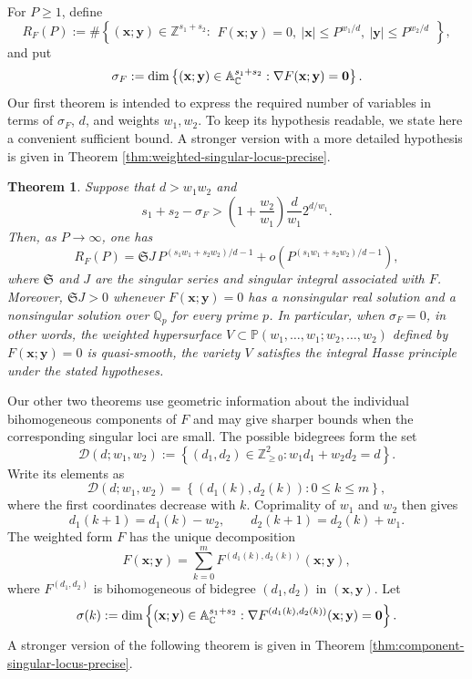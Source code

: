 \documentclass[12pt,reqno]{amsart}
\newtheorem{theorem}{Theorem}[section]
\theoremstyle{definition}
\theoremstyle{remark}
\numberwithin{equation}{section}
\def\bfx{{\mathbf x}}
\def\bfy{{\mathbf y}}
\def\C{{\mathbb C}}\def\D{{\mathbb D}}
\def\Z{{\mathbb Z}}\def\Q{{\mathbb Q}}
\def\A{{\mathbb A}}
\begin{document}
For $P\geq1$, define
\[
R_F(P):=\#\left\{(\bfx;\bfy)\in\Z^{s_1+s_2}:
\begin{array}{c}
F(\bfx;\bfy)=0,\ 
|\bfx|\leq P^{w_1/d},\ |\bfy|\leq P^{w_2/d}
\end{array}
\right\},
\]
and put
\begin{equation}\label{def of sigmaF}
\sigma_F:=\dim\left\{(\bfx;\bfy)\in\A_{\C}^{s_1+s_2}:
\nabla F(\bfx;\bfy)=\bf0\right\}.
\end{equation}
Our first theorem is intended to express the required number of variables in
terms of $\sigma_F$, $d$, and weights $w_1,w_2$.  To keep its hypothesis
readable, we state here a convenient sufficient bound.  A stronger version
with a more detailed hypothesis is given in Theorem
\ref{thm:weighted-singular-locus-precise}.
\begin{theorem}\label{thm:weighted-singular-locus}
Suppose that $d>w_1w_2$ and
\[
s_1+s_2-\sigma_F>
\left(1+\frac{w_2}{w_1}\right)
\frac d{w_1}2^{d/w_1}.
\]
Then, as $P\to\infty$, one has
\[
R_F(P)=\mathfrak S J\,P^{(s_1w_1+s_2w_2)/d-1}
+o\left(P^{(s_1w_1+s_2w_2)/d-1}\right),
\]
where $\mathfrak S$ and $J$ are the singular series and singular integral
associated with $F$. Moreover, $\mathfrak S J>0$ whenever
$F(\bfx;\bfy)=0$ has a nonsingular real solution and a nonsingular solution
over $\Q_p$ for every prime $p$. In particular, when $\sigma_F=0$, in other words, the
weighted hypersurface $V\subset \mathbb{P}(w_1,\ldots,w_1;w_2,\ldots,w_2)$ defined by $F(\bfx;\bfy)=0$ is quasi-smooth, the variety $V$ satisfies the integral Hasse
principle under the stated hypotheses.
\end{theorem}



Our other two theorems use geometric information about the individual
bihomogeneous components of $F$ and may give sharper bounds when the
corresponding singular loci are small. The possible bidegrees form the set
\[
    \mathcal D(d;w_1,w_2)
    :=\left\{(d_1,d_2)\in\Z_{\geq0}^2:
    w_1d_1+w_2d_2=d\right\}.
\]
Write its elements as
\[
    \mathcal D(d;w_1,w_2)
    =\left\{(d_1(k),d_2(k)):0\leq k\leq m\right\},
\]
where the first coordinates decrease with $k$. Coprimality of $w_1$ and
$w_2$ then gives
\[
    d_1(k+1)=d_1(k)-w_2,
    \qquad
    d_2(k+1)=d_2(k)+w_1.
\]
The weighted form $F$ has the unique decomposition
\begin{equation}\label{eqs:decomp}
    F(\bfx;\bfy)
    =\sum_{k=0}^{m}
    F^{(d_1(k),d_2(k))}(\bfx;\bfy),
\end{equation}
where $F^{(d_1,d_2)}$ is bihomogeneous of bidegree $(d_1,d_2)$ in
$(\bfx,\bfy)$. Let
\begin{equation}\label{def:sigma k}
    \sigma(k):=\dim\left\{(\bfx;\bfy)\in\A_{\C}^{s_1+s_2}:
    \nabla F^{(d_1(k),d_2(k))}(\bfx;\bfy)=\bf0\right\}.
\end{equation}
A stronger version of the following theorem is given in Theorem
\ref{thm:component-singular-locus-precise}.
\end{document}
